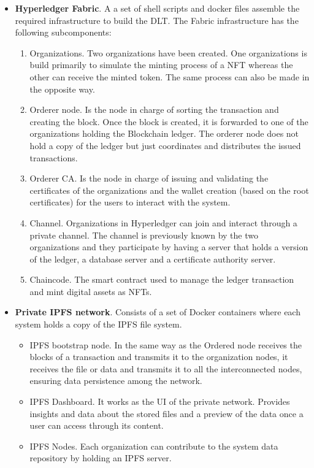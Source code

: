 \documentclass[a4paper]{article}
\begin{document}
\begin{itemize}
    \item \textbf{Hyperledger Fabric}. A a set of shell scripts and docker files assemble the required infrastructure to build the  DLT. The Fabric infrastructure has the following subcomponents: 
    \begin{enumerate}
        \item Organizations. Two organizations have been created. One organizations is build primarily to simulate the minting process of a NFT whereas the other can receive the minted token. The same process can also be made in the opposite way.
        \item Orderer node. Is the node in charge of sorting the transaction and creating the block. Once the block is created, it is forwarded to one of the organizations holding the Blockchain ledger. The orderer node does not hold a copy of the ledger but just coordinates and distributes the issued transactions.
        \item Orderer CA. Is the node in charge of issuing and validating the certificates of the organizations and the wallet creation (based on the root certificates) for the users to interact with the system.
        \item Channel. Organizations in Hyperledger can join and interact through a private channel. The channel is previously known by the two organizations and they participate by having a server that holds a version of the ledger, a database server and a certificate authority server.
        \item Chaincode. The smart contract used to manage the ledger transaction and mint digital assets as NFTs.
    \end{enumerate}
    \item \textbf{Private IPFS network}. Consists of a set of Docker containers where each system holds a copy of the IPFS file system\cite{benet2014ipfs}.
    \begin{itemize}
        \item IPFS bootstrap node. In the same way as the Ordered node receives the blocks of a transaction and transmits it to the organization nodes, it receives the file or data and transmits it to all the interconnected nodes, ensuring data persistence among the network.
        \item IPFS Dashboard. It works as the UI of the private network. Provides insights and data about the stored files and a preview of the data once a user can access through its content.
        \item IPFS Nodes. Each organization can contribute to the system data repository by holding an IPFS server.

\end{itemize}
\end{itemize}
\end{document}
